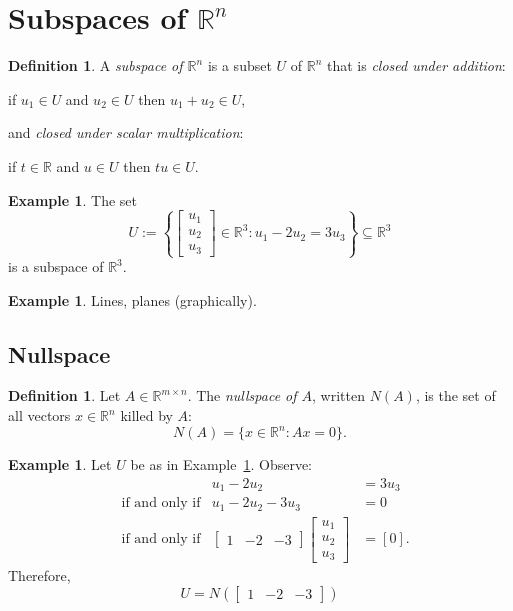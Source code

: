 \documentclass[fullpage]{amsart}
\newcommand{\RR}{\mathbb{R}}
\theoremstyle{definition}
\newtheorem{definition}[theorem]{Definition}
\newtheorem{example}[theorem]{Example}
\begin{document}
\setlength{\parskip}{0.5em}
\setlength{\parindent}{0em}

\section{Subspaces of $\RR^n$}

\begin{definition}
A \emph{subspace of $\RR^n$} is a subset $U$ of $\RR^n$ that is \emph{closed under addition}:
\begin{center}
if $u_1\in U$ and $u_2\in U$ then $u_1+u_2\in U$,
\end{center}
and \emph{closed under scalar multiplication}:
\begin{center}
if $t\in \RR$ and $u\in U$ then $tu\in U$.
\end{center}
\end{definition}

\begin{example}\label{example:first_subspace} The set
$$U:=\left\{\begin{bmatrix}u_1\\u_2\\u_3\end{bmatrix}\in \RR^3 : u_1-2u_2=3u_3\right\}\subseteq \RR^3$$ is a subspace of $\RR^3$.
\end{example}

\begin{example}
  Lines, planes (graphically).
\end{example}

\subsection{Nullspace}
\begin{definition}
  Let $A\in\RR^{m\times n}$. The \emph{nullspace of $A$}, written $N(A)$, is the set of all vectors $x\in\RR^n$ killed by $A$:
  $$N(A) = \{x\in\RR^n : Ax=0\}.$$ 
\end{definition}

\begin{example} Let $U$ be as in Example~\ref{example:first_subspace}. Observe:
\begin{align*}
&&u_1-2u_2&=3u_3 \\
&\text{if and only if}& u_1-2u_2-3u_3&=0\\
&\text{if and only if}&\begin{bmatrix}1&-2&-3\end{bmatrix}
\begin{bmatrix}u_1\\u_2\\u_3\end{bmatrix}&=[0].
 \end{align*}
Therefore, $$U=N\left(\begin{bmatrix}1&-2&-3\end{bmatrix}\right)$$
\end{example}
\end{document}
